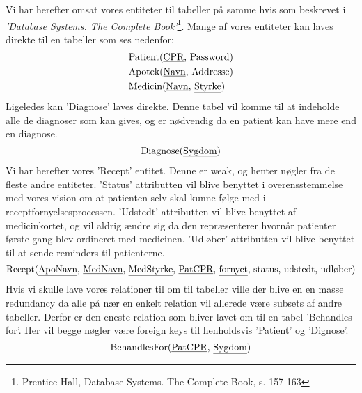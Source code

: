 Vi har herefter omsat vores entiteter til tabeller på samme hvis som beskrevet i \textit{'Database Systems. The Complete Book'}\footnote{Prentice Hall, Database Systems. The Complete Book, s. 157-163}. Mange af vores entiteter kan laves direkte til en tabeller som ses nedenfor:
\begin{align*}
	&\textrm{Patient}(\textrm{\underline{CPR}, Password})\\
	&\textrm{Apotek}(\textrm{\underline{Navn}, Addresse})\\
	&\textrm{Medicin}(\textrm{\underline{Navn}, \underline{Styrke}})\\
\end{align*}
Ligeledes kan 'Diagnose' laves direkte. Denne tabel vil komme til at indeholde alle de diagnoser som kan gives, og er nødvendig da en patient kan have mere end en diagnose.
\begin{equation*}
\textrm{Diagnose}(\textrm{\underline{Sygdom}})
\end{equation*}
Vi har herefter vores 'Recept' entitet. Denne er weak, og henter nøgler fra de fleste andre entiteter. 'Status' attributten vil blive benyttet i overensstemmelse med vores vision om at patienten selv skal kunne følge med i receptfornyelsesprocessen. 'Udstedt' attributten vil blive benyttet af medicinkortet, og vil aldrig ændre sig da den repræsenterer hvornår patienter første gang blev ordineret med medicinen. 'Udløber' attributten vil blive benyttet til at sende reminders til patienterne. 
\begin{equation*}
	\textrm{Recept}(\textrm{\underline{ApoNavn}, \underline{MedNavn}, \underline{MedStyrke}, \underline{PatCPR}, \underline{fornyet}, status, udstedt, udløber})
\end{equation*}
Hvis vi skulle lave vores relationer til om til tabeller ville der blive en en masse redundancy da alle på nær en enkelt relation vil allerede være subsets af andre tabeller. Derfor er den eneste relation som bliver lavet om til en tabel 'Behandles for'. Her vil begge nøgler være foreign keys til henholdsvis 'Patient' og 'Dignose'.
\begin{equation*}
\textrm{BehandlesFor}(\textrm{\underline{PatCPR}, \underline{Sygdom}})
\end{equation*}